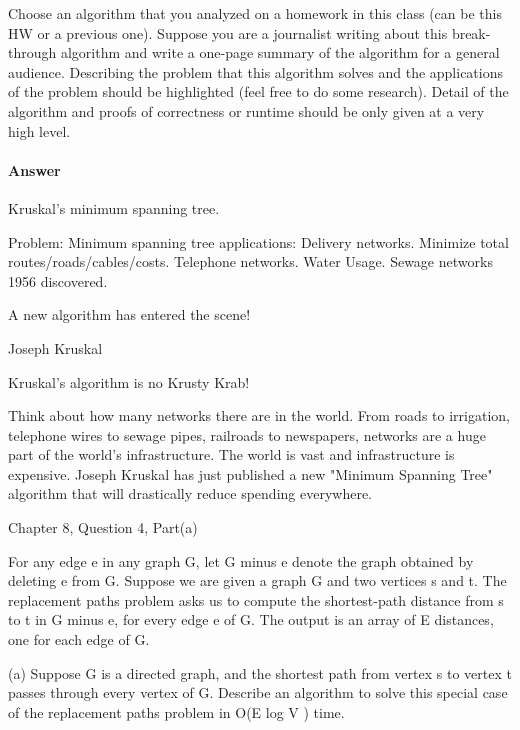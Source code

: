 \documentclass{article}
\begin{document}
\collab{\todo{}}
\nextprob{}

Choose an algorithm that you analyzed on a homework in this class (can be this
HW or a previous one).  Suppose you are a journalist writing about this
break-through algorithm and write a one-page summary of the algorithm for a
general audience.  Describing the problem that this algorithm solves and the
applications of the problem should be highlighted (feel free to do some
research).  Detail of the algorithm and proofs of correctness or runtime should
be only given at a very high level.

\paragraph{Answer}

Kruskal's minimum spanning tree.

Problem: Minimum spanning tree
applications: Delivery networks. Minimize total routes/roads/cables/costs. Telephone networks. Water Usage. Sewage networks
1956 discovered.

A new algorithm has entered the scene!

Joseph Kruskal

Kruskal's algorithm is no Krusty Krab!

Think about how many networks there are in the world. From roads to irrigation,
telephone wires to sewage pipes, railroads to newspapers, networks are a huge
part of the world's infrastructure. The world is vast and infrastructure is expensive.
Joseph Kruskal has just published a new "Minimum Spanning Tree" algorithm that
will drastically reduce spending everywhere.





\collab{\todo{}}

Chapter 8, Question 4, Part(a)

For any edge e in any graph G, let G minus e denote the graph obtained by
deleting e from G. Suppose we are given a graph G and two vertices s
and t. The replacement paths problem asks us to compute the shortest-path
distance from s to t in G minus e, for every edge e of G. The output is an array
of E distances, one for each edge of G.

(a) Suppose G is a directed graph, and the shortest path from vertex s to
vertex t passes through every vertex of G. Describe an algorithm to solve
this special case of the replacement paths problem in O(E log V ) time.
\end{document}
